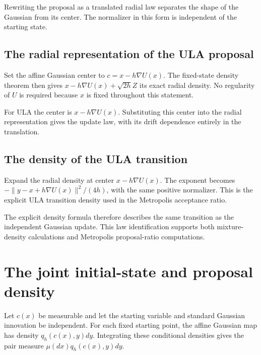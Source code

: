\documentclass[11pt,a4paper]{report}
\begin{document}
Rewriting the proposal as a translated radial law separates the shape of the Gaussian from its center. The normalizer in this form is independent of the starting state.

\subsection{\texorpdfstring{The radial representation of the ULA proposal}{The radial representation of the ULA proposal}}
\label{report-step-UnadjustedLangevin-GaussianProposalDensity-lean-18}


Set the affine Gaussian center to \(c=x-h\nabla U(x)\). The fixed-state density theorem then gives \(x-h\nabla U(x)+\sqrt{2h}Z\) its exact radial density. No regularity of \(U\) is required because \(x\) is fixed throughout this statement.



For ULA the center is \(x-h\nabla U(x)\). Substituting this center into the radial representation gives the update law, with its drift dependence entirely in the translation.

\subsection{\texorpdfstring{The density of the ULA transition}{The density of the ULA transition}}
\label{report-step-UnadjustedLangevin-GaussianProposalDensity-lean-19}


Expand the radial density at center \(x-h\nabla U(x)\). The exponent becomes \(-\|y-x+h\nabla U(x)\|^2/(4h)\), with the same positive normalizer. This is the explicit ULA transition density used in the Metropolis acceptance ratio.



The explicit density formula therefore describes the same transition as the independent Gaussian update. This law identification supports both mixture-density calculations and Metropolis proposal-ratio computations.

\section{\texorpdfstring{The joint initial-state and proposal density}{The joint initial-state and proposal density}}
\label{proof-module-UnadjustedLangevin-GaussianProposalPairDensity-lean}


Let \(c(x)\) be measurable and let the starting variable and standard Gaussian innovation be independent. For each fixed starting point, the affine Gaussian map has density \(q_h(c(x),y)dy\). Integrating these conditional densities gives the pair measure \(\mu(dx)q_h(c(x),y)dy\).
\end{document}
